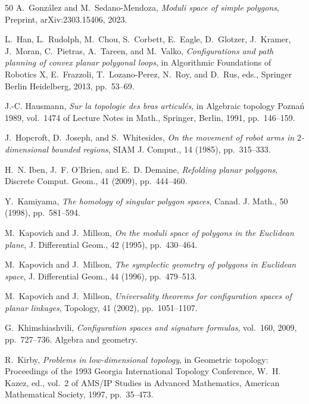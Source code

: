 \documentclass[11pt,letterpaper]{amsart}
\theoremstyle{plain}
\theoremstyle{definition}
\theoremstyle{remark}
\numberwithin{equation}{section}
\begin{document}
\begin{thebibliography}{50}
{\sc A.~Gonz{\'a}lez and M.~Sedano-Mendoza}, {\em Moduli space of simple
  polygons},
\newblock Preprint, {arXiv}:2303.15406, 2023.

{\sc L.~Han, L.~Rudolph, M.~Chou, S.~Corbett, E.~Eagle, D.~Glotzer, J.~Kramer,
  J.~Moran, C.~Pietras, A.~Tareen, and M.~Valko}, {\em Configurations and path
  planning of convex planar polygonal loops}, in Algorithmic Foundations of
  Robotics X, E.~Frazzoli, T.~Lozano-Perez, N.~Roy, and D.~Rus, eds., Springer
  Berlin Heidelberg, 2013, pp.~53--69.

{\sc J.-C. Hausmann}, {\em Sur la topologie des bras articul\'es}, in Algebraic
  topology {P}ozna\'n{} 1989, vol.~1474 of Lecture Notes in Math., Springer,
  Berlin, 1991, pp.~146--159.

{\sc J.~Hopcroft, D.~Joseph, and S.~Whitesides}, {\em On the movement of robot
  arms in {$2$}-dimensional bounded regions}, SIAM J. Comput., 14 (1985),
  pp.~315--333.

{\sc H.~N. Iben, J.~F. O'Brien, and E.~D. Demaine}, {\em Refolding planar
  polygons}, Discrete Comput. Geom., 41 (2009), pp.~444--460.

{\sc Y.~Kamiyama}, {\em The homology of singular polygon spaces}, Canad. J.
  Math., 50 (1998), pp.~581--594.

{\sc M.~Kapovich and J.~Millson}, {\em On the moduli space of polygons in the
  {E}uclidean plane}, J. Differential Geom., 42 (1995), pp.~430--464.

{\sc M.~Kapovich and J.~Millson}, {\em The symplectic geometry of polygons
  in {E}uclidean space}, J. Differential Geom., 44 (1996), pp.~479--513.

{\sc M.~Kapovich and J.~Millson}, {\em Universality theorems for
  configuration spaces of planar linkages}, Topology, 41 (2002),
  pp.~1051--1107.

{\sc G.~Khimshiashvili}, {\em Configuration spaces and signature formulas},
  vol.~160, 2009, pp.~727--736.
\newblock Algebra and geometry.

{\sc R.~Kirby}, {\em Problems in low-dimensional topology}, in Geometric
  topology: Proceedings of the 1993 Georgia International Topology Conference,
  W.~H. Kazez, ed., vol.~2 of AMS/IP Studies in Advanced Mathematics, American
  Mathematical Society, 1997, pp.~35--473.


\end{thebibliography}
\end{document}
